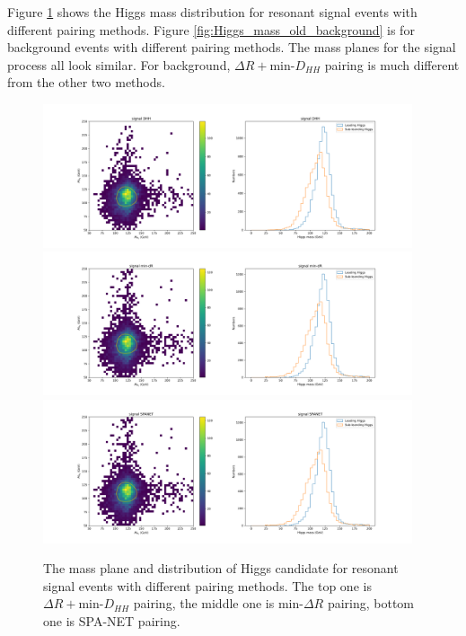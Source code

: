 \documentclass[12pt]{article}
\begin{document}
	Figure \ref{fig:Higgs_mass_old_signal} shows the Higgs mass distribution for resonant signal events with different pairing methods. Figure \ref{fig:Higgs_mass_old_background} is for background events with different pairing methods. The mass planes for the signal process all look similar. For background, $\Delta R + \text{min-}D_{HH}$ pairing is much different from the other two methods.
	\begin{figure}[htpb]
		\centering
		\includegraphics[width=0.97\textwidth]{Higgs_mass_old_DHH_s.png}
		\includegraphics[width=0.97\textwidth]{Higgs_mass_old_mindR_s.png}
		\includegraphics[width=0.97\textwidth]{Higgs_mass_old_SPANET_s.png}
		\caption{The mass plane and distribution of Higgs candidate for resonant signal events with different pairing methods. The top one is $\Delta R + \text{min-}D_{HH}$ pairing, the middle one is $\text{min-}\Delta R$ pairing, bottom one is SPA-NET pairing.}
		\label{fig:Higgs_mass_old_signal}
	\end{figure}
\end{document}
